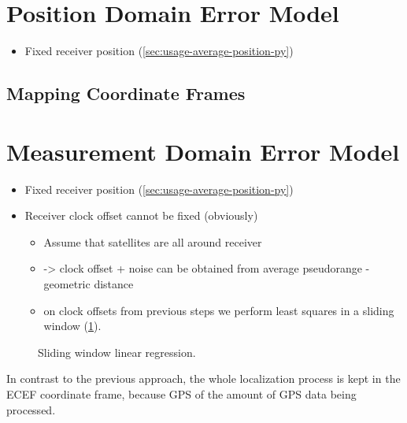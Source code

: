 \section{Position Domain Error Model}
\begin{itemize}
\item Fixed receiver position (\cref{sec:usage-average-position-py})
\end{itemize}

\subsection{Mapping Coordinate Frames}
\label{sec:impl-coordinates}

\section{Measurement Domain Error Model}
\begin{itemize}
\item Fixed receiver position (\cref{sec:usage-average-position-py})
\item Receiver clock offset cannot be fixed (obviously)
    \begin{itemize}
    \item Assume that satellites are all around receiver
    \item -> clock offset + noise can be obtained from average pseudorange - geometric distance
    \item on clock offsets from previous steps we perform least squares in a sliding window
        (\cref{fig:sliding-window-linear-regression}).
    \end{itemize}
\end{itemize}

\begin{figure}[h]
	\centering
	
	\caption{Sliding window linear regression.}
	\label{fig:sliding-window-linear-regression}
\end{figure}


In contrast to the previous approach, the whole localization process is kept in
the ECEF coordinate frame, because GPS of the amount of GPS data being processed.

